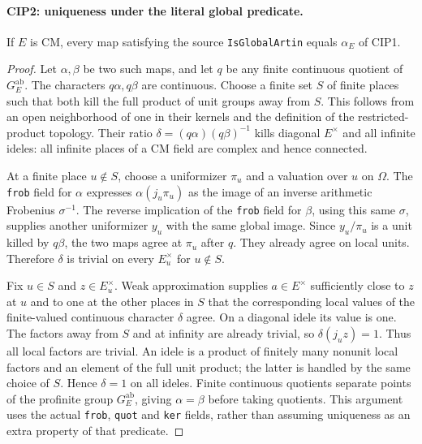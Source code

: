 \paragraph{CIP2: uniqueness under the literal global predicate.}
\label{claim:CIP2}
If $E$ is CM, every map satisfying the source
\texttt{IsGlobalArtin} equals $\alpha_E$ of CIP1.
\begin{proof}
Let $\alpha,\beta$ be two such maps, and let $q$ be any finite
continuous quotient of $G_E^{\mathrm{ab}}$.  The characters
$q\alpha,q\beta$ are continuous.  Choose a finite set $S$ of finite
places such that both kill the full product of unit groups away
from $S$.  This follows from an open neighborhood of one in their
kernels and the definition of the restricted-product topology.
Their ratio $\delta=(q\alpha)(q\beta)^{-1}$ kills diagonal $E^\times$
and all infinite ideles: all infinite places of a CM field are
complex and hence connected.

At a finite place $u\notin S$, choose a uniformizer $\pi_u$ and a
valuation over $u$ on $\Omega$.  The \texttt{frob} field for
$\alpha$ expresses $\alpha(j_u\pi_u)$ as the image of an inverse
arithmetic Frobenius $\sigma^{-1}$.  The reverse implication of the
\texttt{frob} field for $\beta$, using this same $\sigma$, supplies
another uniformizer $y_u$ with the same global image.  Since
$y_u/\pi_u$ is a unit killed by $q\beta$, the two maps agree at
$\pi_u$ after $q$.  They already agree on local units.  Therefore
$\delta$ is trivial on every $E_u^\times$ for $u\notin S$.

Fix $u\in S$ and $z\in E_u^\times$.  Weak approximation supplies
$a\in E^\times$ sufficiently close to $z$ at $u$ and to one at the
other places in $S$ that the corresponding local values of the
finite-valued continuous character $\delta$ agree.  On a diagonal
idele its value is one.  The factors away from $S$ and at infinity
are already trivial, so $\delta(j_u z)=1$.  Thus all local factors
are trivial.  An idele is a product of finitely many nonunit local
factors and an element of the full unit product; the latter is
handled by the same choice of $S$.  Hence $\delta=1$ on all ideles.
Finite continuous quotients separate points of the profinite group
$G_E^{\mathrm{ab}}$, giving $\alpha=\beta$ before taking quotients.
This argument uses the actual \texttt{frob}, \texttt{quot} and
\texttt{ker} fields, rather than assuming uniqueness as an extra
property of that predicate.
\end{proof}

